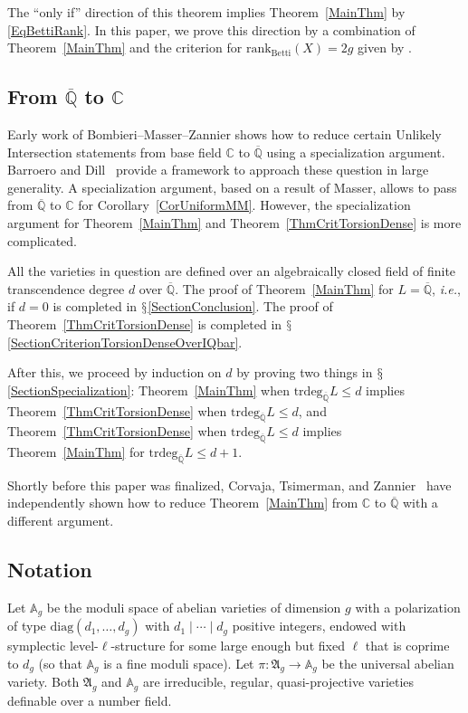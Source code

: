\documentclass[12pt,oneside]{amsart}
\numberwithin{maincounter}{section}
\numberwithin{equation}{section}
\def\AA{\mathbb{A}}
\def\CC{\mathbb{C}}
\def\QQ{\mathbb{Q}}
\newcommand{\IC}{{\CC}}
\newcommand{\IQbar}{{\overline{\QQ}}}
\newcommand{\IA}{{\AA}}
\begin{document}
The ``only if'' direction of this theorem implies Theorem~\ref{MainThm} by \eqref{EqBettiRank}. In this paper, we prove this direction by a combination of Theorem~\ref{MainThm} and the criterion for $\mathrm{rank}_{\mathrm{Betti}}(X) = 2g$ given by \cite[Theorem~1.1]{GaoBettiRank}.


\subsection{From $\IQbar$ to $\IC$}
Early work of Bombieri--Masser--Zannier \cite{BMZUnlikely} shows how
to reduce certain Unlikely Intersection statements from base field $\IC$ to
$\IQbar$ using a specialization argument.
Barroero and Dill~\cite{BarDill:distinguised} provide a
 framework to approach these question in large generality. 
A specialization argument, based on a result of Masser, allows to pass
from $\IQbar$ to $\IC$ for Corollary~\ref{CorUniformMM}. However, the
specialization argument for Theorem~\ref{MainThm} and
Theorem~\ref{ThmCritTorsionDense} is more complicated.

All the varieties in question are defined over an algebraically closed
field of finite transcendence degree $d$ over $\IQbar$.
The proof of Theorem~\ref{MainThm} for $L=\IQbar$, \textit{i.e.}, if $d =
0$ is completed in $\mathsection$\ref{SectionConclusion}.
The proof of Theorem~\ref{ThmCritTorsionDense} is completed in
$\mathsection$\ref{SectionCriterionTorsionDenseOverIQbar}.


After this, we proceed by induction on $d$ by proving 
  two things in
$\mathsection$\ref{SectionSpecialization}: Theorem~\ref{MainThm} when
$\mathrm{trdeg}_\IQbar L\le d$ implies
Theorem~\ref{ThmCritTorsionDense} when
$\mathrm{trdeg}_\IQbar L\le d$, and
Theorem~\ref{ThmCritTorsionDense} when
$\mathrm{trdeg}_\IQbar L\le d$ implies
Theorem~\ref{MainThm} for
$\mathrm{trdeg}_\IQbar L\le d+1$.


Shortly before this paper was finalized, Corvaja, Tsimerman, and Zannier~\cite[Appendix~A]{CTZ:23} have independently
shown how to reduce Theorem~\ref{MainThm} from
$\IC$ to $\IQbar$ with a different argument.





\subsection{Notation} 
Let $\mathbb{A}_g$ be the moduli space of abelian varieties of
dimension $g$ with a polarization of type $\mathrm{diag}(d_1,\ldots,d_g)$
with $d_1\mid \cdots\mid d_g$ positive integers, endowed with
symplectic level-$\ell$-structure for some large enough but fixed
$\ell$ that is coprime to $d_g$ (so that $\mathbb{A}_g$ is a fine
moduli space).
Let $\pi\colon \mathfrak{A}_g \rightarrow \mathbb{A}_g$
be the universal abelian variety.
Both $\mathfrak{A}_g$ and $\IA_g$ are irreducible, regular,
quasi-projective varieties definable over a number field.
\end{document}
